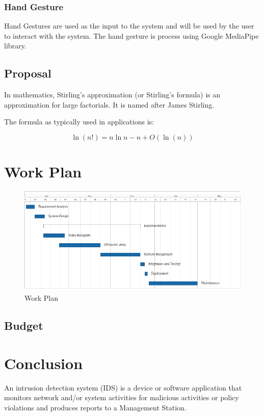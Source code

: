 \documentclass{fisatproject}
\begin{document}
\subsection{Hand Gesture}
Hand Gestures are used as the input to the system and will be used by the user to interact with the system.
The hand gesture is process using Google  MediaPipe library.

\section{Proposal}
In mathematics, Stirling's approximation (or Stirling's formula) is an approximation for large factorials. It is named after James Stirling.

The formula as typically used in applications is:

$$
\ln (n!) = n \ln n - n  + O(\ln(n))
$$

\chapter{Work Plan}
    \begin{figure}[h!]
        \begin{center}
        \includegraphics[scale=.6]{images/work_plan.png}
        \caption{Work Plan}
        \end{center}
        \end{figure}
 \section{Budget}
\chapter{Conclusion}

An intrusion detection system (IDS) \cite{nist} is a device or software application that monitors network and/or system activities for malicious activities or policy violations and produces reports to a Management Station.
\end{document}
